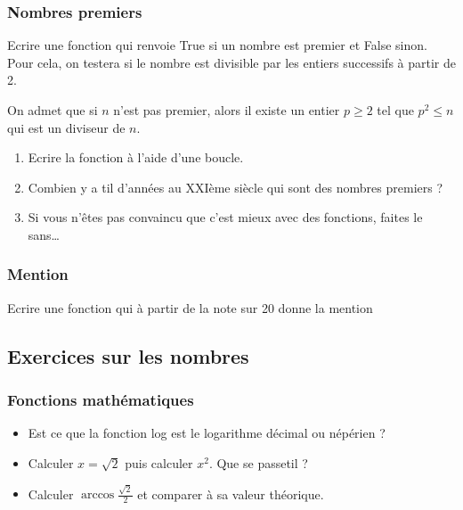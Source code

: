 \documentclass[letterpaper,10pt,english]{sphinxhowto}
\begin{document}
\subsubsection{Nombres premiers}
\label{\detokenize{cours1_fonctions_exercices:nombres-premiers}}
\sphinxAtStartPar
Ecrire une fonction qui renvoie True si un nombre est premier et False sinon. Pour cela, on testera si le nombre
est divisible par les entiers successifs à partir de 2.

\sphinxAtStartPar
On admet que si \(n\) n’est pas premier, alors il existe un entier \(p \ge 2\) tel que \(p^2 \le n\) qui est un diviseur de \(n\).
\begin{enumerate}
%
\item {} 
\sphinxAtStartPar
Ecrire la fonction à l’aide d’une boucle.

\item {} 
\sphinxAtStartPar
Combien y a t\sphinxhyphen{}il d’années au XXIème siècle qui sont des nombres premiers ?

\item {} 
\sphinxAtStartPar
Si vous n’êtes pas convaincu que c’est mieux avec des fonctions, faites le sans…

\end{enumerate}


\subsubsection{Mention}
\label{\detokenize{cours1_fonctions_exercices:mention}}
\sphinxAtStartPar
Ecrire une fonction qui à partir de la note sur 20 donne la mention


\subsection{Exercices sur les nombres}
\label{\detokenize{cours2_nombres_exercices:exercices-sur-les-nombres}}\label{\detokenize{cours2_nombres_exercices::doc}}

\subsubsection{Fonctions mathématiques}
\label{\detokenize{cours2_nombres_exercices:fonctions-mathematiques}}\begin{itemize}
\item {} 
\sphinxAtStartPar
Est ce que la fonction log est le logarithme décimal ou népérien ?

\item {} 
\sphinxAtStartPar
Calculer \(x = \sqrt{2}\) puis calculer \(x^2\). Que se passe\sphinxhyphen{}t\sphinxhyphen{}il ?

\item {} 
\sphinxAtStartPar
Calculer \(\arccos{\frac{\sqrt{2}}{2}}\) et comparer à sa valeur théorique.

\end{itemize}
\end{document}
